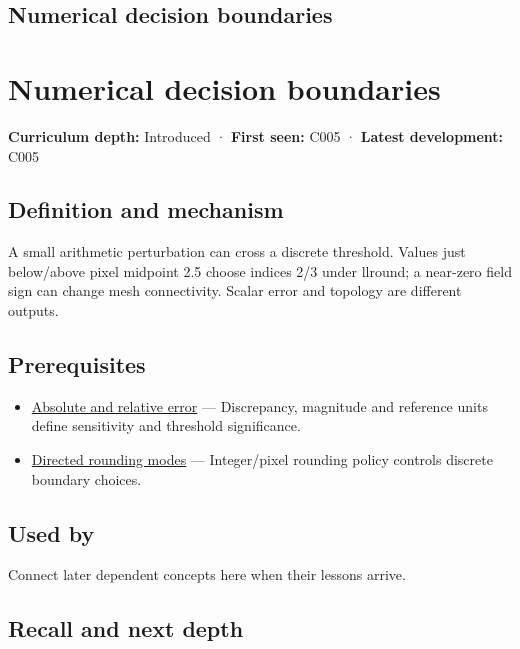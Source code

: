 \hypertarget{appendix-c80db39080be}{}
\section*{Numerical decision boundaries}
\chapter{Numerical decision boundaries}\label{appendix-c80db39080be-numerical-decision-boundaries}

\textbf{Curriculum depth:} Introduced · \textbf{First seen:} C005 · \textbf{Latest development:} C005

\section{Definition and mechanism}\label{appendix-c80db39080be-definition-and-mechanism}

A small arithmetic perturbation can cross a discrete threshold. Values just below/above pixel midpoint 2.5 choose indices 2/3 under llround; a near-zero field sign can change mesh connectivity. Scalar error and topology are different outputs.

\section{Prerequisites}\label{appendix-c80db39080be-prerequisites}

\begin{itemize}
\tightlist
\item
  \hyperref[appendix-3ae74e89b4e6]{Absolute and relative error} --- Discrepancy, magnitude and reference units define sensitivity and threshold significance.
\item
  \hyperref[appendix-637d164ae5ca]{Directed rounding modes} --- Integer/pixel rounding policy controls discrete boundary choices.
\end{itemize}

\section{Used by}\label{appendix-c80db39080be-used-by}

Connect later dependent concepts here when their lessons arrive.

\section{Recall and next depth}\label{appendix-c80db39080be-recall-and-next-depth}

